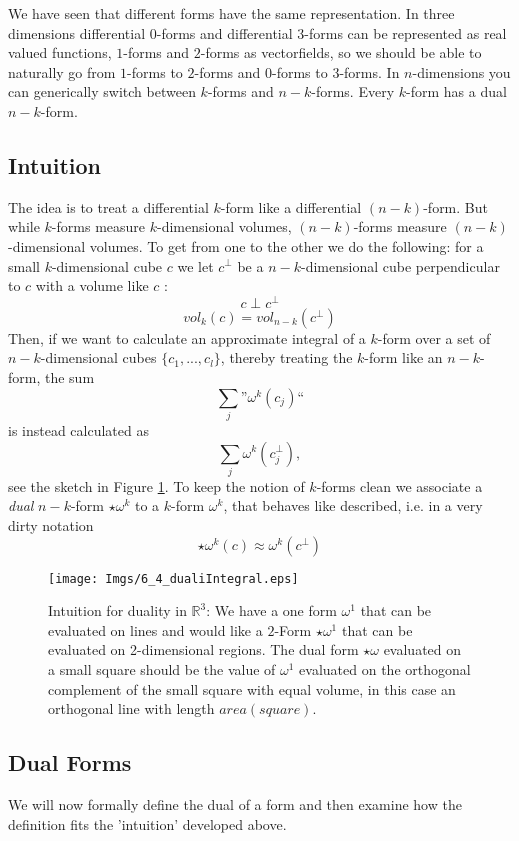 We have seen that different forms have the same representation. In three dimensions differential $0$-forms and differential $3$-forms can be represented as real valued functions, $1$-forms and $2$-forms as vectorfields, so we should be able to naturally go from $1$-forms to $2$-forms and $0$-forms to $3$-forms. In $n$-dimensions you can generically switch between $k$-forms and $n-k$-forms. Every $k$-form has a dual $n-k$-form.

\subsection{Intuition}
\label{subsec:hodgeintuition}
The idea is to treat a differential $k$-form like a differential $(n-k)$-form. But while $k$-forms measure $k$-dimensional volumes, $(n-k)$-forms measure $(n-k)$-dimensional volumes.
To get from one to the other we do the following: for a small $k$-dimensional cube $c$ we let $c^\perp$ be a $n-k$-dimensional cube perpendicular to $c$ with a volume like $c$ :
\[c\perp c^\perp \]
\[vol_k(c) = vol_{n-k}(c^\perp)\] 
Then, if we want to calculate an approximate integral of a $k$-form over a set of $n-k$-dimensional cubes $\{c_1,...,c_l\}$, thereby treating the $k$-form like an $n-k$-form, the sum
\[\sum_{j} \text{''}\omega^k(c_j)\text{``}\]
is instead calculated as 
\[\sum_{j} \omega^k(c_j^{\perp}),\]
see the sketch in Figure \ref{fig::6_1_dualIntegral}. To keep the notion of $k$-forms clean we associate a \emph{dual} $n-k$-form $\star\omega^k$ to a $k$-form $\omega^k$, that behaves like described, i.e. in a very dirty notation
\[\star\omega^k(c) \approx  \omega^k(c^\perp)\]
\begin{figure}[t]
\begin{center}
\texttt{[image: Imgs/6\_4\_dualiIntegral.eps]}
\end{center}
\caption{Intuition for duality in $\mathbb R^3$: We have a one form $\omega^1$ that can be evaluated on lines and would like a $2$-Form $\star \omega^1$ that can be evaluated on 2-dimensional regions. The dual form $\star \omega$ evaluated on a small square should be the value of $\omega^1$ evaluated on the orthogonal complement of the small square with equal volume, in this case an orthogonal line with length $area(square)$. }
\label{fig::6_1_dualIntegral}
\end{figure}

\subsection{Dual Forms}
We will now formally define the dual of a form and then examine how the definition fits the 'intuition' developed above. 

